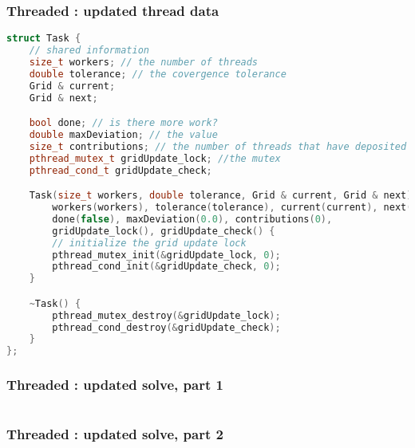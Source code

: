 \begin{frame}[fragile]
% 
  \frametitle{Threaded : updated thread data}
%
  \begin{lstlisting}[language=c++,name=Jacobi:updated-threaded,basicstyle=\tt\bfseries\tiny]
struct Task {
    // shared information 
    size_t workers; // the number of threads
    double tolerance; // the covergence tolerance
    Grid & current;
    Grid & next;

    bool done; // is there more work?
    double maxDeviation; // the value
    size_t contributions; // the number of threads that have deposited contributions
    pthread_mutex_t gridUpdate_lock; //the mutex
    pthread_cond_t gridUpdate_check;

    Task(size_t workers, double tolerance, Grid & current, Grid & next) :
        workers(workers), tolerance(tolerance), current(current), next(next),
        done(false), maxDeviation(0.0), contributions(0),
        gridUpdate_lock(), gridUpdate_check() {
        // initialize the grid update lock
        pthread_mutex_init(&gridUpdate_lock, 0);
        pthread_cond_init(&gridUpdate_check, 0);
    }

    ~Task() {
        pthread_mutex_destroy(&gridUpdate_lock);
        pthread_cond_destroy(&gridUpdate_check);
    }
};

  \end{lstlisting}
%
\end{frame}

\begin{frame}[fragile]
% 
  \frametitle{Threaded : updated solve, part 1}
%
  \begin{lstlisting}[language=c++,name=Jacobi:updated-solve,basicstyle=\tt\bfseries\tiny]
  \end{lstlisting}
%
\end{frame}

\begin{frame}[fragile]
% 
  \frametitle{Threaded : updated solve, part 2}
%
  \begin{lstlisting}[language=c++,name=Jacobi:updated-solve,basicstyle=\tt\bfseries\tiny]
  \end{lstlisting}
%
\end{frame}

